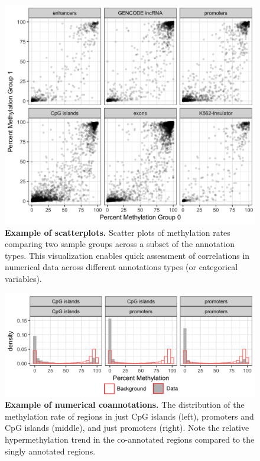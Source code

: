 \newpage

\begin{figure}[ht!]
\centering
\includegraphics[width=1\textwidth]{chap4figs/figure4_5.png}
\caption[Example of scatterplots.]
{
\textbf{Example of scatterplots.} Scatter plots of methylation rates comparing two sample groups across a subset of the annotation types. This visualization enables quick assessment of correlations in numerical data across different annotations types (or categorical variables).
}
\label{chap4:fig:5}
\end{figure}

\newpage

\begin{figure}[ht!]
\centering
\includegraphics[width=1\textwidth]{chap4figs/figure4_6.png}
\caption[Example of numerical coannotations.]
{
\textbf{Example of numerical coannotations.} The distribution of the methylation rate of regions in just CpG islands (left), promoters and CpG islands (middle), and just promoters (right). Note the relative hypermethylation trend in the co-annotated regions compared to the singly annotated regions.
}
\label{chap4:fig:6}
\end{figure}

